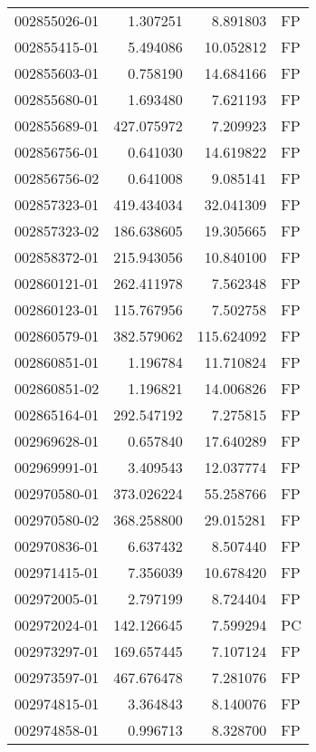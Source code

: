 \begin{tabular}{lrrl}
002855026-01 &    1.307251 &       8.891803 &   FP \\
002855415-01 &    5.494086 &      10.052812 &   FP \\
002855603-01 &    0.758190 &      14.684166 &   FP \\
002855680-01 &    1.693480 &       7.621193 &   FP \\
002855689-01 &  427.075972 &       7.209923 &   FP \\
002856756-01 &    0.641030 &      14.619822 &   FP \\
002856756-02 &    0.641008 &       9.085141 &   FP \\
002857323-01 &  419.434034 &      32.041309 &   FP \\
002857323-02 &  186.638605 &      19.305665 &   FP \\
002858372-01 &  215.943056 &      10.840100 &   FP \\
002860121-01 &  262.411978 &       7.562348 &   FP \\
002860123-01 &  115.767956 &       7.502758 &   FP \\
002860579-01 &  382.579062 &     115.624092 &   FP \\
002860851-01 &    1.196784 &      11.710824 &   FP \\
002860851-02 &    1.196821 &      14.006826 &   FP \\
002865164-01 &  292.547192 &       7.275815 &   FP \\
002969628-01 &    0.657840 &      17.640289 &   FP \\
002969991-01 &    3.409543 &      12.037774 &   FP \\
002970580-01 &  373.026224 &      55.258766 &   FP \\
002970580-02 &  368.258800 &      29.015281 &   FP \\
002970836-01 &    6.637432 &       8.507440 &   FP \\
002971415-01 &    7.356039 &      10.678420 &   FP \\
002972005-01 &    2.797199 &       8.724404 &   FP \\
002972024-01 &  142.126645 &       7.599294 &   PC \\
002973297-01 &  169.657445 &       7.107124 &   FP \\
002973597-01 &  467.676478 &       7.281076 &   FP \\
002974815-01 &    3.364843 &       8.140076 &   FP \\
002974858-01 &    0.996713 &       8.328700 &   FP \\

\end{tabular}
